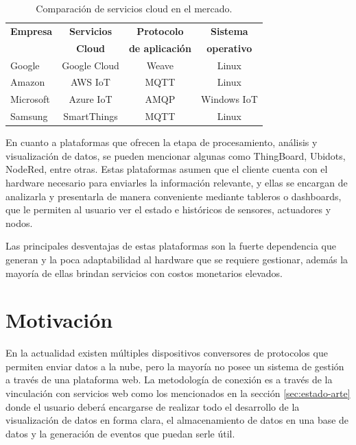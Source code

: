 \begin{table}[h]
	\centering
	\caption[Comparación de servicios cloud en el mercado.]{Comparación de servicios cloud en el mercado.}
	\begin{tabular}{l c c c}    
		\toprule
		\textbf{Empresa} 	 & \textbf{Servicios} 		& \textbf{Protocolo}     & \textbf{Sistema}\\
		 	 						 & \textbf{Cloud} 		& \textbf{de aplicación}     & \textbf{operativo}\\
		\midrule
		Google 			& Google Cloud 				& Weave 		& Linux\\		
		Amazon	 	& AWS IoT						& MQTT		& Linux\\
		Microsoft	 	& Azure IoT						& AMQP 		& Windows IoT\\
		Samsung	 	& SmartThings					& MQTT 		& Linux\\
		\bottomrule
		\hline
	\end{tabular}
	\label{tab:cloud-emp}
\end{table}

En cuanto a plataformas que ofrecen la etapa de procesamiento, análisis y visualización de datos, se pueden mencionar algunas como ThingBoard, Ubidots, NodeRed, entre otras. Estas plataformas asumen que el cliente cuenta con el hardware necesario para enviarles la información relevante, y ellas se encargan de analizarla y presentarla de manera conveniente mediante tableros o dashboards, que le permiten al usuario ver el estado e históricos de sensores, actuadores y nodos. 

Las principales desventajas de estas plataformas son la fuerte dependencia que generan y la poca adaptabilidad al hardware que se requiere gestionar, además la mayoría de ellas brindan servicios con costos monetarios elevados.



\section{Motivación}

En la actualidad existen múltiples dispositivos conversores de protocolos que permiten enviar datos a la nube, pero la mayoría no posee un sistema de gestión a través de una plataforma web. La metodología de conexión es a través de la vinculación con servicios web como los mencionados en la sección \ref{sec:estado-arte} donde el usuario deberá encargarse de realizar todo el desarrollo de la visualización de datos en forma clara, el almacenamiento de datos en una base de datos y la generación de eventos que puedan serle útil. 

